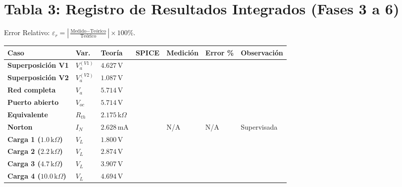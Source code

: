 \documentclass[11pt, a4paper]{article}
\begin{document}
\section*{Tabla 3: Registro de Resultados Integrados (Fases 3 a 6)}
Error Relativo: $\varepsilon_r = \left| \frac{\text{Medido} - \text{Teórico}}{\text{Teórico}} \right| \times 100\%$.

\vspace{0.3cm}
\noindent
\begin{tabularx}{\textwidth}{|>{\bfseries\RaggedRight}p{2.8cm}|>{\centering\arraybackslash}p{1cm}|>{\RaggedRight\arraybackslash}X|>{\RaggedRight\arraybackslash}X|>{\RaggedRight\arraybackslash}X|>{\RaggedRight\arraybackslash}X|>{\RaggedRight\arraybackslash}p{2.5cm}|}
\hline
\rowcolor{ucbblue!10}
\textbf{Caso} & \textbf{Var.} & \textbf{Teoría} & \textbf{SPICE} & \textbf{Medición} & \textbf{Error \%} & \textbf{Observación} \\ \hline
Superposición V1 & $V_{a}^{(V1)}$ & $4.627\,\text{V}$ & & & & \\ \hline
Superposición V2 & $V_{a}^{(V2)}$ & $1.087\,\text{V}$ & & & & \\ \hline
Red completa & $V_{a}$ & $5.714\,\text{V}$ & & & & \\ \hline
Puerto abierto & $V_{oc}$ & $5.714\,\text{V}$ & & & & \\ \hline
Equivalente & $R_{th}$ & $2.175\,\text{k}\Omega$ & & & & \\ \hline
Norton & $I_{N}$ & $2.628\,\text{mA}$ & & N/A & N/A & Supervisada \\ \hline
Carga 1 ($1.0\,\text{k}\Omega$) & $V_L$ & $1.800\,\text{V}$ & & & & \\ \hline
Carga 2 ($2.2\,\text{k}\Omega$) & $V_L$ & $2.874\,\text{V}$ & & & & \\ \hline
Carga 3 ($4.7\,\text{k}\Omega$) & $V_L$ & $3.907\,\text{V}$ & & & & \\ \hline
Carga 4 ($10.0\,\text{k}\Omega$) & $V_L$ & $4.694\,\text{V}$ & & & & \\ \hline
\end{tabularx}
\end{document}

